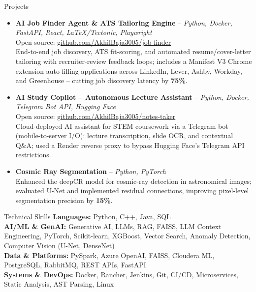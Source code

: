 \documentclass[11pt]{resume}
\begin{document}

\begin{rSection}{Projects}
\begin{itemize}
    \setlength{\itemsep}{-0.35em}
    \setlength{\parsep}{0em}
    \item \textbf{AI Job Finder Agent \& ATS Tailoring Engine} -- {\em Python, Docker, FastAPI, React, LaTeX/Tectonic, Playwright} \\
    Open source: \href{https://github.com/AkhilBaja3005/job-finder}{github.com/AkhilBaja3005/job-finder} \\
    End-to-end job discovery, ATS fit-scoring, and automated resume/cover-letter tailoring with recruiter-review feedback loops; includes a Manifest V3 Chrome extension auto-filling applications across LinkedIn, Lever, Ashby, Workday, and Greenhouse -- cutting job discovery latency by \textbf{75\%}.
    \item \textbf{AI Study Copilot -- Autonomous Lecture Assistant} -- {\em Python, Docker, Telegram Bot API, Hugging Face} \\
    Open source: \href{https://github.com/AkhilBaja3005/notes-taker}{github.com/AkhilBaja3005/notes-taker} \\
    Cloud-deployed AI assistant for STEM coursework via a Telegram bot (mobile-to-server I/O): lecture transcription, slide OCR, and contextual Q\&A; used a Render reverse proxy to bypass Hugging Face's Telegram API restrictions.
    \item \textbf{Cosmic Ray Segmentation} -- {\em Python, PyTorch} \\
    Enhanced the deepCR model for cosmic-ray detection in astronomical images; evaluated U-Net and implemented residual connections, improving pixel-level segmentation precision by \textbf{15\%}.
\end{itemize}
\end{rSection}


\begin{rSection}{Technical Skills}
\textbf{Languages:} Python, C++, Java, SQL \\
\textbf{AI/ML \& GenAI:} Generative AI, LLMs, RAG, FAISS, LLM Context Engineering, PyTorch, Scikit-learn, XGBoost, Vector Search, Anomaly Detection, Computer Vision (U-Net, DenseNet) \\
\textbf{Data \& Platforms:} PySpark, Azure OpenAI, FAISS, Cloudera ML, PostgreSQL, RabbitMQ, REST APIs, FastAPI \\
\textbf{Systems \& DevOps:} Docker, Rancher, Jenkins, Git, CI/CD, Microservices, Static Analysis, AST Parsing, Linux
\end{rSection}
\end{document}
